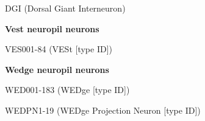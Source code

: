 \documentclass{article}
\begin{document}
{\noindent\hspace*{1.0em}DGI (Dorsal Giant Interneuron)\par
\noindent\textbf{Vest neuropil neurons}\par
\noindent\hspace*{1.0em}VES001-84 (VESt [type ID])\par
\noindent\textbf{Wedge neuropil neurons}\par
\noindent\hspace*{1.0em}WED001-183 (WEDge [type ID])\par
\noindent\hspace*{1.0em}WEDPN1-19 (WEDge Projection Neuron [type ID])\par
}
\end{document}
